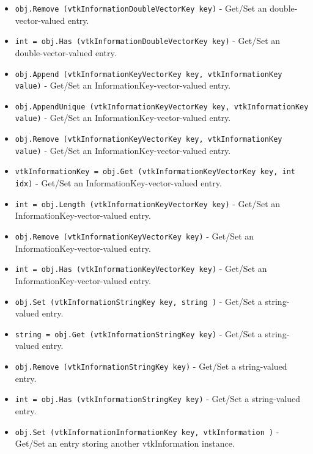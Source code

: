 \begin{itemize}
\item  \verb|obj.Remove (vtkInformationDoubleVectorKey key)| -  Get/Set an double-vector-valued entry.

\item  \verb|int = obj.Has (vtkInformationDoubleVectorKey key)| -  Get/Set an double-vector-valued entry.

\item  \verb|obj.Append (vtkInformationKeyVectorKey key, vtkInformationKey value)| -  Get/Set an InformationKey-vector-valued entry.

\item  \verb|obj.AppendUnique (vtkInformationKeyVectorKey key, vtkInformationKey value)| -  Get/Set an InformationKey-vector-valued entry.

\item  \verb|obj.Remove (vtkInformationKeyVectorKey key, vtkInformationKey value)| -  Get/Set an InformationKey-vector-valued entry.

\item  \verb|vtkInformationKey = obj.Get (vtkInformationKeyVectorKey key, int idx)| -  Get/Set an InformationKey-vector-valued entry.

\item  \verb|int = obj.Length (vtkInformationKeyVectorKey key)| -  Get/Set an InformationKey-vector-valued entry.

\item  \verb|obj.Remove (vtkInformationKeyVectorKey key)| -  Get/Set an InformationKey-vector-valued entry.

\item  \verb|int = obj.Has (vtkInformationKeyVectorKey key)| -  Get/Set an InformationKey-vector-valued entry.

\item  \verb|obj.Set (vtkInformationStringKey key, string )| -  Get/Set a string-valued entry.

\item  \verb|string = obj.Get (vtkInformationStringKey key)| -  Get/Set a string-valued entry.

\item  \verb|obj.Remove (vtkInformationStringKey key)| -  Get/Set a string-valued entry.

\item  \verb|int = obj.Has (vtkInformationStringKey key)| -  Get/Set a string-valued entry.

\item  \verb|obj.Set (vtkInformationInformationKey key, vtkInformation )| -  Get/Set an entry storing another vtkInformation instance.


\end{itemize}
